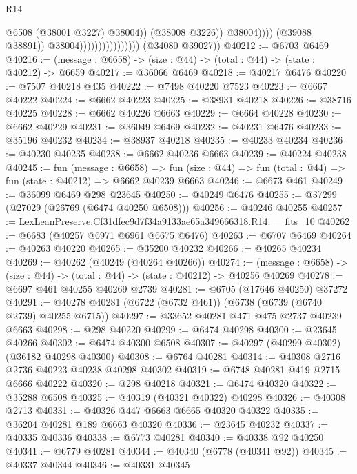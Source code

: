 \begin{lexlean}{R14}
\begin{coremodule}
                                                      @6508
                                                      (@38001 @3227)
                                                      @38004))
                                                  (@38008 @3226))
                                                @38004))))
                                        (@39088 @38891))
                                      @38004))))))))))))))))
      (@34080 @39027))
@40212 := @6703 @6469
@40216 := (message : @6658) -> (size : @44) -> (total : @44) -> (state : @40212) -> @6659
@40217 := @36066 @6469
@40218 := @40217 @6476
@40220 := @7507 @40218 @435
@40222 := @7498 @40220 @7523
@40223 := @6667 @40222
@40224 := @6662 @40223
@40225 := @38931 @40218
@40226 := @38716 @40225
@40228 := @6662 @40226 @6663
@40229 := @6664 @40228
@40230 := @6662 @40229
@40231 := @36049 @6469
@40232 := @40231 @6476
@40233 := @35196 @40232
@40234 := @38937 @40218
@40235 := @40233 @40234
@40236 := @40230 @40235
@40238 := @6662 @40236 @6663
@40239 := @40224 @40238
@40245 := fun (message : @6658) =>
  fun (size : @44) => fun (total : @44) => fun (state : @40212) => @6662 @40239 @6663
@40246 := @6673 @461
@40249 := @36099 @6469 @298 @23645
@40250 := @40249 @6476
@40255 := @37299 (@27029 (@26769 (@6474 @40250 @6508)))
@40256 := @40246 @40255
@40257 := LexLeanPreserve.Cf31dfec9d7f34a9133ae65a349666318.R14.__fits_10
@40262 := @6683 (@40257 @6971 @6961 @6675 @6476)
@40263 := @6707 @6469
@40264 := @40263 @40220
@40265 := @35200 @40232
@40266 := @40265 @40234
@40269 := @40262 (@40249 (@40264 @40266))
@40274 := (message : @6658) -> (size : @44) -> (total : @44) -> (state : @40212) -> @40256 @40269
@40278 := @6697 @461 @40255 @40269 @2739
@40281 := @6705 (@17646 @40250) @37272
@40291 := @40278 @40281 (@6722 (@6732 @461)) (@6738 (@6739 (@6740 @2739) @40255 @6715))
@40297 := @33652 @40281 @471 @475 @2737 @40239 @6663
@40298 := @298 @40220
@40299 := @6474 @40298
@40300 := @23645 @40266
@40302 := @6474 @40300 @6508
@40307 := @40297 (@40299 @40302) (@36182 @40298 @40300)
@40308 := @6764 @40281
@40314 := @40308 @2716 @2736 @40223 @40238 @40298 @40302
@40319 := @6748 @40281 @419 @2715 @6666 @40222
@40320 := @298 @40218
@40321 := @6474 @40320
@40322 := @35288 @6508
@40325 := @40319 (@40321 @40322) @40298
@40326 := @40308 @2713
@40331 := @40326 @447 @6663 @6665 @40320 @40322
@40335 := @36204 @40281 @189 @6663 @40320
@40336 := @23645 @40232
@40337 := @40335 @40336
@40338 := @6773 @40281
@40340 := @40338 @92 @40250
@40341 := @6779 @40281
@40344 := @40340 (@6778 (@40341 @92))
@40345 := @40337 @40344
@40346 := @40331 @40345

\end{coremodule}
\end{lexlean}
